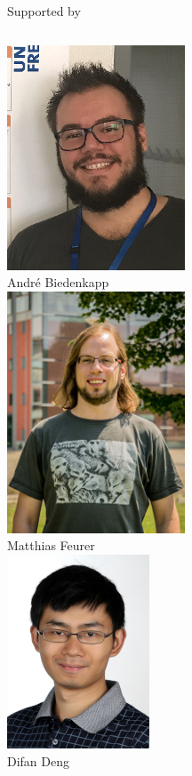 \begin{frame}[c]{Supported by}


\begin{columns}

	\centering	
	\includegraphics[width=.3\textwidth]{images/biedenkapp.png}\\
	Andr\'e Biedenkapp\\[1.em]
	
	\includegraphics[width=.3\textwidth]{images/feurer_small.jpg}\\
	Matthias Feurer\\[1.em]

	
    	\centering
    \includegraphics[width=.3\textwidth]{images/difan_small.jpg}\\
    Difan Deng\\[1.em]    	
    	

\end{columns}
\end{frame}
